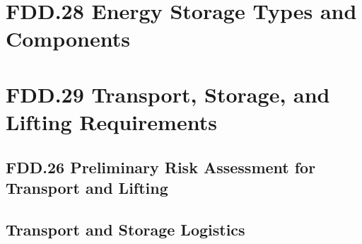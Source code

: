 \section{FDD.28 Energy Storage Types and Components}

\section{FDD.29 Transport, Storage, and Lifting Requirements}
\subsection{FDD.26 Preliminary Risk Assessment for Transport and Lifting}
\subsection{Transport and Storage Logistics}

\newpage
{}
 {
    \newpage
}